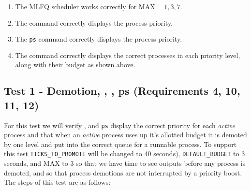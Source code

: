 \documentclass[11pt,letterpaper]{report}
\begin{document}
\begin{enumerate}
	\item The MLFQ scheduler works correctly for $\textrm{MAX} = 1, 3, 7$.
	
	\item The  command correctly displays the process priority.
	
	\item The {\tt ps} command correctly displays the process priority.
	
	\item The  command correctly displays the correct processes in each priority level, along with their budget as shown above.
	\end{enumerate}
	
\subsection*{Test 1 - Demotion, , , ps (Requirements 4, 10, 11, 12) }
	For this test we will verify ,  and {\tt ps} display the correct priority for each \emph{active} process and that when an \emph{active} process uses up it's 
	allotted budget it is demoted by one level and put into the correct queue for a runnable process. To support this test {\tt TICKS\_TO\_PROMOTE} will be changed to 40 seconds), {\tt DEFAULT\_BUDGET} to 3 seconds, and MAX to 3 so that we have time to see outputs before any process is demoted, and so that process demotions are not interrupted by a priority boost. The steps of this test are as follows:
	
\end{document}
